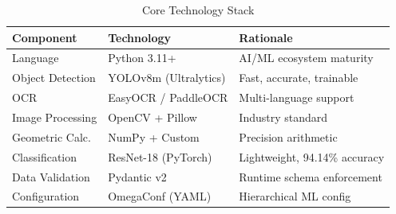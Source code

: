 \begin{table}[htbp]
\centering
\caption{Core Technology Stack}
\label{tab:technology-stack}
\begin{tabular}{@{}llp{5cm}@{}}
\toprule
\textbf{Component} & \textbf{Technology} & \textbf{Rationale} \\
\midrule
Language         & Python 3.11+          & AI/ML ecosystem maturity \\
Object Detection & YOLOv8m (Ultralytics) & Fast, accurate, trainable \\
OCR              & EasyOCR / PaddleOCR   & Multi-language support \\
Image Processing & OpenCV + Pillow       & Industry standard \\
Geometric Calc.  & NumPy + Custom        & Precision arithmetic \\
Classification   & ResNet-18 (PyTorch)   & Lightweight, 94.14\% accuracy \\
Data Validation  & Pydantic v2           & Runtime schema enforcement \\
Configuration    & OmegaConf (YAML)      & Hierarchical ML config \\
\bottomrule
\end{tabular}
\end{table}